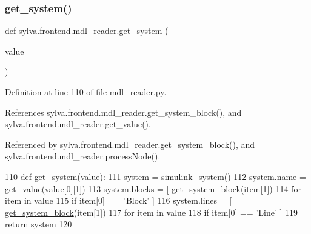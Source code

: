 \subsubsection{\texorpdfstring{get\+\_\+system()}{get\_system()}}
{\footnotesize\ttfamily def sylva.\+frontend.\+mdl\+\_\+reader.\+get\+\_\+system (\begin{DoxyParamCaption}\item[{}]{value }\end{DoxyParamCaption})}



Definition at line 110 of file mdl\+\_\+reader.\+py.



References sylva.\+frontend.\+mdl\+\_\+reader.\+get\+\_\+system\+\_\+block(), and sylva.\+frontend.\+mdl\+\_\+reader.\+get\+\_\+value().



Referenced by sylva.\+frontend.\+mdl\+\_\+reader.\+get\+\_\+system\+\_\+block(), and sylva.\+frontend.\+mdl\+\_\+reader.\+process\+Node().


\begin{DoxyCode}
110   \textcolor{keyword}{def }\hyperlink{namespacesylva_1_1frontend_1_1mdl__reader_a51ec6ceefd4c16f0d3d80edbdc40c0e9}{get\_system}(value):
111     system = simulink\_system()
112     system.name = \hyperlink{namespacesylva_1_1frontend_1_1mdl__reader_a1109464081a5fe17543fc36a494625bd}{get\_value}(value[0][1])
113     system.blocks = [ \hyperlink{namespacesylva_1_1frontend_1_1mdl__reader_ae055d388934ef992b5b05417b47b2940}{get\_system\_block}(item[1])
114                       \textcolor{keywordflow}{for} item \textcolor{keywordflow}{in} value
115                         \textcolor{keywordflow}{if} item[0] == \textcolor{stringliteral}{'Block'} ]
116     system.lines = [ \hyperlink{namespacesylva_1_1frontend_1_1mdl__reader_ae055d388934ef992b5b05417b47b2940}{get\_system\_block}(item[1])
117                       \textcolor{keywordflow}{for} item \textcolor{keywordflow}{in} value
118                         \textcolor{keywordflow}{if} item[0] == \textcolor{stringliteral}{'Line'} ]
119     \textcolor{keywordflow}{return} system
120 
\end{DoxyCode}
\mbox{\label{namespacesylva_1_1frontend_1_1mdl__reader_ae055d388934ef992b5b05417b47b2940}} 
